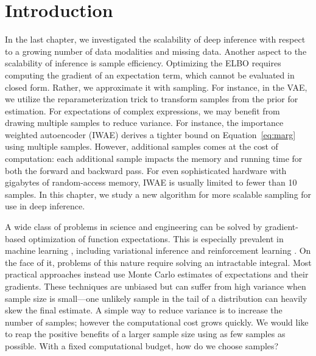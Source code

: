 \section{Introduction}
\label{sec:introduction}
In the last chapter, we investigated the scalability of deep inference with respect to a growing number of data modalities and missing data. Another aspect to the scalability of inference is sample efficiency. Optimizing the ELBO requires computing the gradient of an expectation term, which cannot be evaluated in closed form. Rather, we approximate it with sampling. For instance, in the VAE, we utilize the reparameterization trick \cite{kingma2013auto,rezende2014stochastic} to transform samples from the prior for estimation. For expectations of complex expressions, we may benefit from drawing multiple samples to reduce variance. For instance, the importance weighted autoencoder (IWAE) \cite{burda2015importance} derives a tighter bound on Equation~\ref{eq:marg} using multiple samples. However, additional samples comes at the cost of computation: each additional sample impacts the memory and running time for both the forward and backward pass. For even sophisticated hardware with gigabytes of random-access memory, IWAE is usually limited to fewer than 10 samples. In this chapter, we study a new algorithm for more scalable sampling for use in deep inference.

A wide class of problems in science and engineering can be solved by gradient-based optimization of function expectations.
This is especially prevalent in machine learning \cite{schulman2015gradient},  including variational inference \cite{ranganath2014black, rezende2014stochastic} and reinforcement learning \cite{silver2014deterministic}.
On the face of it, problems of this nature require solving an intractable integral.
Most practical approaches instead use Monte Carlo estimates of expectations and their gradients.
These techniques are unbiased but can suffer from high variance when sample size is small---one unlikely sample in the tail of a distribution can heavily skew the final estimate.
A simple way to reduce variance is to increase the number of samples; however the computational cost grows quickly. We would like to reap the positive benefits of a larger sample size using as few samples as possible. With a fixed computational budget, how do we choose samples?

